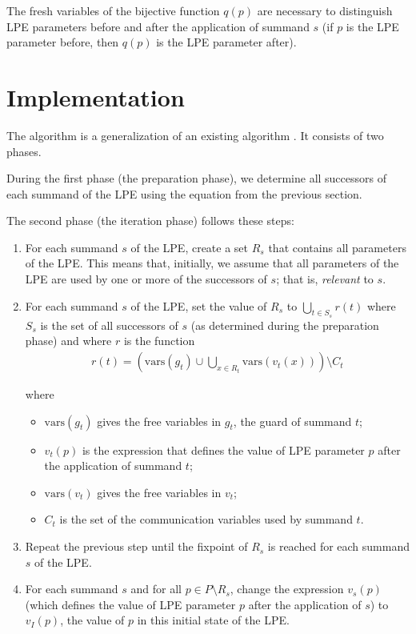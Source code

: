 The fresh variables of the bijective function $q(p)$ are necessary to distinguish LPE parameters before and after the application of summand $s$ (if $p$ is the LPE parameter before, then $q(p)$ is the LPE parameter after).

\section{Implementation}

The algorithm is a generalization of an existing algorithm \cite{van2009state}.
It consists of two phases.

During the first phase (the preparation phase), we determine all successors of each summand of the LPE using the equation from the previous section.

The second phase (the iteration phase) follows these steps:

\begin{enumerate}

\item For each summand $s$ of the LPE, create a set $R_s$ that contains all parameters of the LPE.
This means that, initially, we assume that all parameters of the LPE are used by one or more of the successors of $s$; that is, \emph{relevant} to $s$.

\item For each summand $s$ of the LPE, set the value of $R_s$ to $\bigcup\limits_{t \in S_s}^{} r(t)$ where $S_s$ is the set of all successors of $s$ (as determined during the preparation phase) and where $r$ is the function
\begin{align*}
r(t) = \left( \text{vars}(g_t) \cup \bigcup\limits_{x \in R_t}^{} \text{vars}(v_t(x)) \right) \setminus C_t
\end{align*}

where

\begin{itemize}
\item $\text{vars}(g_t)$ gives the free variables in $g_t$, the guard of summand $t$;
\item $v_t(p)$ is the expression that defines the value of LPE parameter $p$ after the application of summand $t$;
\item $\text{vars}(v_t)$ gives the free variables in $v_t$;
\item $C_t$ is the set of the communication variables used by summand $t$.
\end{itemize}

\item Repeat the previous step until the fixpoint of $R_s$ is reached for each summand $s$ of the LPE.

\item For each summand $s$ and for all $p \in P \setminus R_s$, change the expression $v_s(p)$ (which defines the value of LPE parameter $p$ after the application of $s$) to $v_I(p)$, the value of $p$ in this initial state of the LPE.

\end{enumerate}

